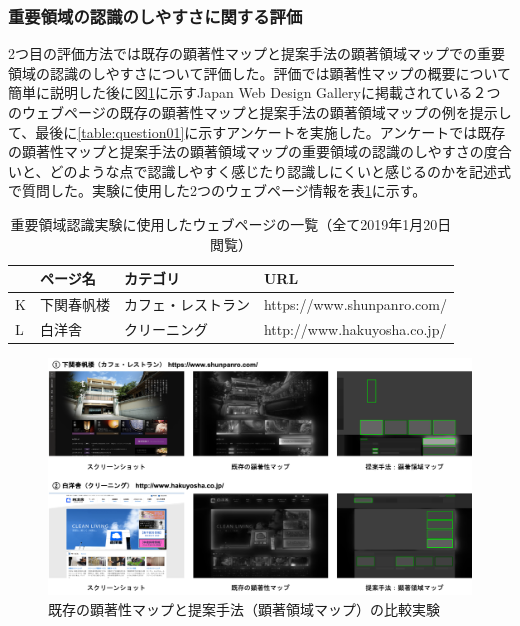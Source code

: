 \subsubsection{重要領域の認識のしやすさに関する評価}
\par 2つ目の評価方法では既存の顕著性マップと提案手法の顕著領域マップでの重要領域の認識のしやすさについて評価した。評価では顕著性マップの概要について簡単に説明した後に図\ref{fig_experience02}に示すJapan Web Design Gallery\cite{japanwebgallery}に掲載されている２つのウェブページの既存の顕著性マップと提案手法の顕著領域マップの例を提示して、最後に\ref{table:question01}に示すアンケートを実施した。アンケートでは既存の顕著性マップと提案手法の顕著領域マップの重要領域の認識のしやすさの度合いと、どのような点で認識しやすく感じたり認識しにくいと感じるのかを記述式で質問した。実験に使用した2つのウェブページ情報を表\ref{table:webpage-list2}に示す。


\begin{table}[h]
    \caption{重要領域認識実験に使用したウェブページの一覧（全て2019年1月20日閲覧）}
    \label{table:webpage-list2}
    \centering
    \begingroup
    \renewcommand{\arraystretch}{1.2} %
    \small
     \begin{tabular}{llll}
      \hline
      & ページ名 & カテゴリ & URL \\
      \hline \hline
      K & 下関春帆楼 & カフェ・レストラン & https://www.shunpanro.com/ \\
      L & 白洋舎 & クリーニング & http://www.hakuyosha.co.jp/ \\
      \hline
    \end{tabular}
    \endgroup
\end{table}



\begin{figure}[H]
    \centering
    \includegraphics[width=12cm]{figures/experience02.png}
    \caption{既存の顕著性マップと提案手法（顕著領域マップ）の比較実験}
    \label{fig_experience02}
\end{figure}

